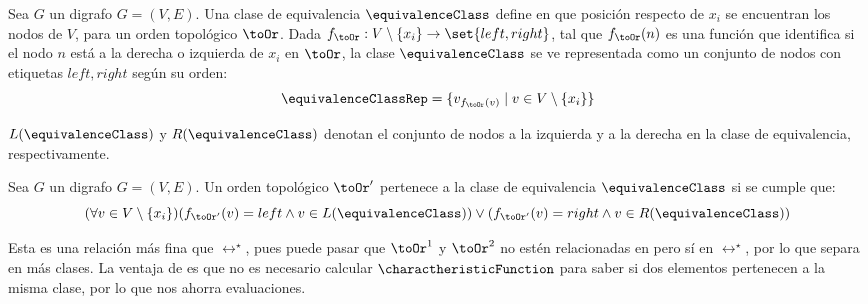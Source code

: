 \begin{definition} \label{equivalenceClassDefinition}
    Sea $G$ un digrafo $G = (V, E)$. Una clase de equivalencia $\equivalenceClass$ define en que posición respecto de $x_i$ se encuentran los nodos de $V$, para un orden topológico $\toOr$. Dada $f_{\toOr}:V \setminus \{x_i\} \to \set{left, right}$, tal que $f_{\toOr}(n)$ es una función que identifica si el nodo $n$ está a la derecha o izquierda de $x_i$ en $\toOr$, la clase  $\equivalenceClass$ se ve representada como un conjunto de nodos con etiquetas $left, right$ según su orden:
    $$
    \equivalenceClassRep = \{ v_{f_{\toOr}(v)} \mid v \in V \setminus \{x_i\} \}
    $$

    
    $L(\equivalenceClass)$ y $R(\equivalenceClass)$ denotan el conjunto de nodos a la izquierda y a la derecha en la clase de equivalencia, respectivamente.
\end{definition}

\begin{definition}
     Sea $G$ un digrafo $G = (V, E)$. Un orden topológico $\toOr'$ pertenece a la clase de equivalencia $\equivalenceClass$ si se cumple que: %
    $$
  (\forall v \in V \setminus \{x_i\}) (f_{\toOr'}(v) = left \land v \in L(\equivalenceClass) ) \lor (f_{\toOr'}(v) = right \land v \in R(\equivalenceClass) )
    $$
\end{definition}


Esta es una relación más fina que $\rel^\star$, pues puede pasar que $\toOr^1$ y $\toOr^2$ no estén relacionadas en \rel{} pero sí en $\rel^\star$, por lo que separa en más clases. La ventaja de \rel{} es que no es necesario calcular $\charactheristicFunction$ para saber si dos elementos pertenecen a la misma clase, por lo que nos ahorra evaluaciones. 


